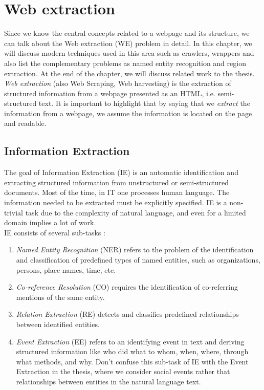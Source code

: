\chapter{Web extraction}

Since we know the central concepts related to a webpage and its structure, we can talk about the Web extraction (WE) problem in detail. In this chapter, we will discuss modern techniques used in this area such as crawlers, wrappers and also list the complementary problems as named entity recognition and region extraction. At the end of the chapter, we will discuss related work to the thesis.\\

\textit{Web extraction} (also Web Scraping, Web harvesting) is the extraction of structured information from a webpage presented as an HTML, i.e. semi-structured text. It is important to highlight that by saying that we \textit{extract} the information from a webpage, we assume the information is located on the page and readable.


\section{Information Extraction}

The goal of Information Extraction (IE) is an automatic identification and extracting structured information from unstructured or semi-structured documents. Most of the time, in IT one processes human language. The information needed to be extracted must be explicitly specified. IE is a non-trivial task due to the complexity of natural language, and even for a limited domain implies a lot of work.\\

IE consists of several sub-tasks \cite{InfExtr}:

\begin{enumerate}
    \item \textit{Named Entity Recognition} (NER) refers to the problem of the identification and classification of predefined types of named entities, such as organizations, persons, place names, time, etc.
    \item \textit{Co-reference Resolution} (CO) requires the identification of co-referring mentions of the same entity.
    \item \textit{Relation Extraction} (RE) detects and classifies predefined relationships between identified entities.
    \item \textit{Event Extraction} (EE) refers to an identifying event in text and deriving structured information like who did what to whom, when, where, through what methods, and why. Don't confuse this sub-task of IE with the Event Extraction in the thesis, where we consider social events rather that relationships between entities in the natural language text. 
\end{enumerate}

